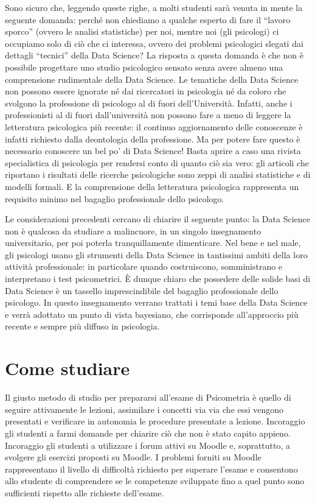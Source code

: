 \documentclass[
]{book}
\theoremstyle{definition}
\theoremstyle{definition}
\theoremstyle{definition}
\theoremstyle{definition}
\theoremstyle{remark}
\begin{document}
Sono sicuro che, leggendo queste righe, a molti studenti sarà venuta in mente la seguente domanda: perché non chiediamo a qualche esperto di fare il ``lavoro sporco'' (ovvero le analisi statistiche) per noi, mentre noi (gli psicologi) ci occupiamo solo di ciò che ci interessa, ovvero dei problemi psicologici slegati dai dettagli ``tecnici'' della Data Science? La risposta a questa domanda è che non è possibile progettare uno studio psicologico sensato senza avere almeno una comprensione rudimentale della Data Science. Le tematiche della Data Science non possono essere ignorate né dai ricercatori in psicologia né da coloro che svolgono la professione di psicologo al di fuori dell'Università. Infatti, anche i professionisti al di fuori dall'università non possono fare a meno di leggere la letteratura psicologica più recente: il continuo aggiornamento delle conoscenze è infatti richiesto dalla deontologia della professione. Ma per potere fare questo è necessario conoscere un bel po' di Data Science! Basta aprire a caso una rivista specialistica di psicologia per rendersi conto di quanto ciò sia vero: gli articoli che riportano i risultati delle ricerche psicologiche sono zeppi di analisi statistiche e di modelli formali. E la comprensione della letteratura psicologica rappresenta un requisito minimo nel bagaglio professionale dello psicologo.

Le considerazioni precedenti cercano di chiarire il seguente punto: la Data Science non è qualcosa da studiare a malincuore, in un singolo insegnamento universitario, per poi poterla tranquillamente dimenticare. Nel bene e nel male, gli psicologi usano gli strumenti della Data Science in tantissimi ambiti della loro attività professionale: in particolare quando costruiscono, somministrano e interpretano i test psicometrici. È dunque chiaro che possedere delle solide basi di Data Science è un tassello imprescindibile del bagaglio professionale dello psicologo. In questo insegnamento verrano trattati i temi base della Data Science e verrà adottato un punto di vista bayesiano, che corrisponde all'approccio più recente e sempre più diffuso in psicologia.

\hypertarget{come-studiare}{%
\section*{Come studiare}\label{come-studiare}}

Il giusto metodo di studio per prepararsi all'esame di Psicometria è quello di seguire attivamente le lezioni, assimilare i concetti via via che essi vengono presentati e verificare in autonomia le procedure presentate a lezione. Incoraggio gli studenti a farmi domande per chiarire ciò che non è stato capito appieno. Incoraggio gli studenti a utilizzare i forum attivi su Moodle e, soprattutto, a svolgere gli esercizi proposti su Moodle. I problemi forniti su Moodle rappresentano il livello di difficoltà richiesto per superare l'esame e consentono allo studente di comprendere se le competenze sviluppate fino a quel punto sono sufficienti rispetto alle richieste dell'esame.
\end{document}
